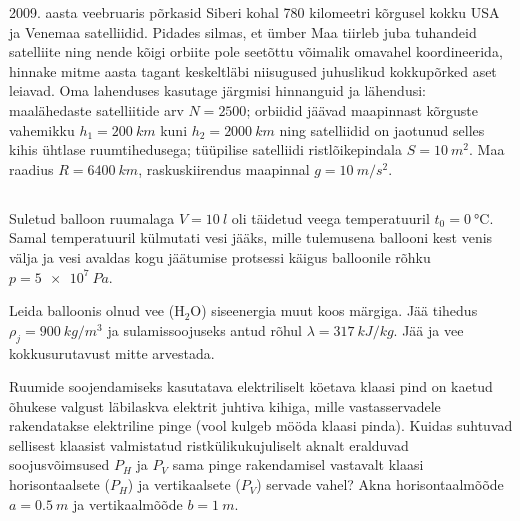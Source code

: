 \documentclass[10pt]{article}
\begin{document}
{
2009. aasta veebruaris põrkasid Siberi kohal 780 kilomeetri kõrgusel kokku USA ja Venemaa satelliidid. Pidades silmas, et ümber Maa tiirleb juba tuhandeid satelliite ning nende kõigi orbiite pole seetõttu võimalik omavahel koordineerida, hinnake mitme aasta tagant keskeltläbi niisugused juhuslikud kokkupõrked aset leiavad. Oma lahenduses kasutage järgmisi hinnanguid ja lähendusi: maalähedaste satelliitide arv $N=\num{2500}$; orbiidid jäävad maapinnast kõrguste vahemikku $h_1=\SI{200}{km}$ kuni $h_2=\SI{2000}{km}$ ning satelliidid on jaotunud selles kihis ühtlase ruumtihedusega; tüüpilise satelliidi ristlõikepindala $S=\SI{10}{m^2}$. Maa raadius $R=\SI{6400}{km}$, raskuskiirendus maapinnal $g=\SI{10}{m/s^2}$.
\probend
\bigskip
\newpage\subsection{\protect{}}


Suletud balloon ruumalaga $V = \SI{10}{l}$ oli täidetud veega temperatuuril $t_0 = \SI{0}{\degreeCelsius}$. Samal temperatuuril külmutati vesi jääks, mille tulemusena ballooni kest venis välja ja vesi avaldas kogu jäätumise protsessi käigus balloonile rõhku $p = \SI{5e7}{Pa}$.

Leida balloonis olnud vee ($\mathrm{H_2O}$) siseenergia muut koos märgiga. Jää tihedus $\rho_j = \SI{900}{kg/m^3}$ ja sulamissoojuseks antud rõhul $\lambda = \SI{317}{kJ/kg}$. Jää ja vee kokkusurutavust mitte arvestada.
\probend
\bigskip


Ruumide soojendamiseks kasutatava elektriliselt köetava klaasi pind on kaetud õhukese valgust läbilaskva elektrit juhtiva kihiga, mille vastasservadele rakendatakse elektriline pinge (vool kulgeb mööda klaasi pinda). Kuidas suhtuvad sellisest klaasist valmistatud ristkülikukujuliselt aknalt eralduvad soojusvõimsused $P_H$ ja $P_V$ sama pinge rakendamisel vastavalt klaasi horisontaalsete ($P_H$) ja vertikaalsete ($P_V$) servade vahel? Akna horisontaalmõõde $a = \SI{0,5}{m}$ ja vertikaalmõõde $b = \SI{1}{m}$.
\probend
\bigskip


}
\end{document}
